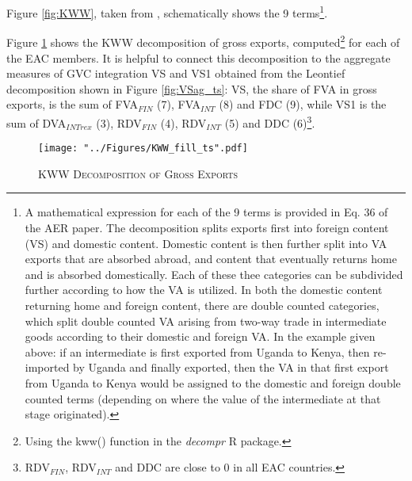 \documentclass[a4paper]{article}
\begin{document}
 Figure \ref{fig:KWW}, taken from \citet{koopman2014tracing}, schematically shows the 9 terms\footnote{A mathematical expression for each of the 9 terms is provided in Eq. 36 of the \citet{koopman2014tracing} AER paper. The decomposition splits exports first into foreign content (VS) and domestic content. Domestic content is then further split into VA exports that are absorbed abroad, and content that eventually returns home and is absorbed domestically. Each of these thee categories can be subdivided further according to how the VA is utilized. In both the domestic content returning home and foreign content, there are double counted categories, which split double counted VA arising from two-way trade in intermediate goods according to their domestic and foreign VA. In the example given above: if an intermediate is first exported from Uganda to Kenya, then re-imported by Uganda and finally exported, then the VA in that first export from Uganda to Kenya would be assigned to the domestic and foreign double counted terms (depending on where the value of the intermediate at that stage originated). }. 



Figure \ref{fig:KWW_fill_ts} shows the KWW decomposition of gross exports, computed\footnote{Using the kww() function in the \emph{decompr} R package.} for each of the EAC members. It is helpful to connect this decomposition to the aggregate measures of GVC integration VS and VS1 obtained from the Leontief decomposition shown in Figure \ref{fig:VSag_ts}: VS, the share of FVA in gross exports, is the sum of FVA$_{FIN}$ (7), FVA$_{INT}$ (8) and FDC (9), while VS1 is the sum of DVA$_{INTrex}$ (3), RDV$_{FIN}$ (4), RDV$_{INT}$ (5) and DDC (6)\footnote{RDV$_{FIN}$, RDV$_{INT}$  and DDC are close to 0 in all EAC countries.}.  

\begin{figure}[h!]
\centering
\caption{\label{fig:KWW_fill_ts}\textsc{KWW Decomposition of Gross Exports}}
\texttt{[image: "../Figures/KWW\_fill\_ts".pdf]} %
\end{figure}
\FloatBarrier
\end{document}
